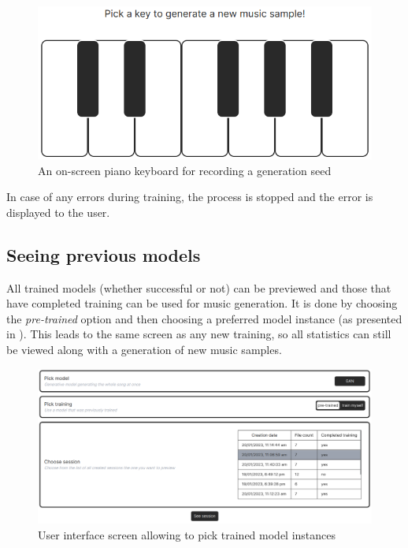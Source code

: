 \documentclass[a4paper, 11pt, twoside]{report}
\theoremstyle{definition}
\begin{document}
\begin{figure}[t]
    \centering
    \includegraphics[width=0.6\linewidth]{gui_record_seed.png}
    \caption{An on-screen piano keyboard for recording a generation seed}
    \label{fig:gui_record_seed}
\end{figure}

In case of any errors during training, the process is stopped and the error is displayed to the user. \par

\subsection{Seeing previous models}

All trained models (whether successful or not) can be previewed and those that have completed training can be used for music generation. It is done by choosing the \textit{pre-trained} option and then choosing a preferred model instance (as presented in ). This leads to the same screen as any new training, so all statistics can still be viewed along with a generation of new music samples. \par

\begin{figure}[t]
    \centering
    \includegraphics[width=0.98\linewidth]{gui_choose_existing_model.png}
    \caption{User interface screen allowing to pick trained model instances}
    \label{fig:gui_choose_existing_model}
\end{figure}
\end{document}
